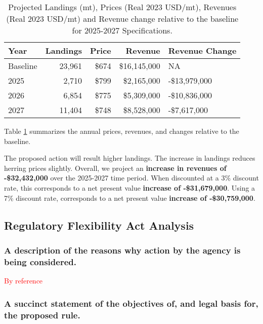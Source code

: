\documentclass[
  12pt,
]{article}
\begin{document}
\begin{table}

\caption{\label{tab:prices_revenues}Projected Landings (mt), Prices (Real 2023 USD/mt),  Revenues (Real 2023 USD/mt) and Revenue change relative to the baseline for  2025-2027 Specifications.}
\centering
\begin{tabular}[t]{lrrrl}
\toprule
\textbf{Year} & \textbf{Landings} & \textbf{Price} & \textbf{Revenue} & \textbf{Revenue Change}\\
\midrule
Baseline & 23,961 & \$674 & \$16,145,000 & NA\\
2025 & 2,710 & \$799 & \$2,165,000 & -\$13,979,000\\
2026 & 6,854 & \$775 & \$5,309,000 & -\$10,836,000\\
2027 & 11,404 & \$748 & \$8,528,000 & -\$7,617,000\\
\bottomrule
\end{tabular}
\end{table}

Table \ref{tab:prices_revenues} summarizes the annual prices, revenues,
and changes relative to the baseline.

The proposed action will result higher landings. The increase in
landings reduces herring prices slightly. Overall, we project an
\textbf{increase in revenues of -\$32,432,000} over the 2025-2027 time
period. When discounted at a 3\% discount rate, this corresponds to a
net present value \textbf{increase of -\$31,679,000}. Using a 7\%
discount rate, corresponds to a net present value \textbf{increase of
-\$30,759,000}.

\clearpage

\hypertarget{regulatory-flexibility-act-analysis}{%
\subsection{Regulatory Flexibility Act
Analysis}\label{regulatory-flexibility-act-analysis}}

\hypertarget{a-description-of-the-reasons-why-action-by-the-agency-is-being-considered.}{%
\subsubsection{A description of the reasons why action by the agency is
being
considered.}\label{a-description-of-the-reasons-why-action-by-the-agency-is-being-considered.}}

\textcolor{red}{By reference}

\hypertarget{a-succinct-statement-of-the-objectives-of-and-legal-basis-for-the-proposed-rule.}{%
\subsubsection{A succinct statement of the objectives of, and legal
basis for, the proposed
rule.}\label{a-succinct-statement-of-the-objectives-of-and-legal-basis-for-the-proposed-rule.}}
\end{document}
